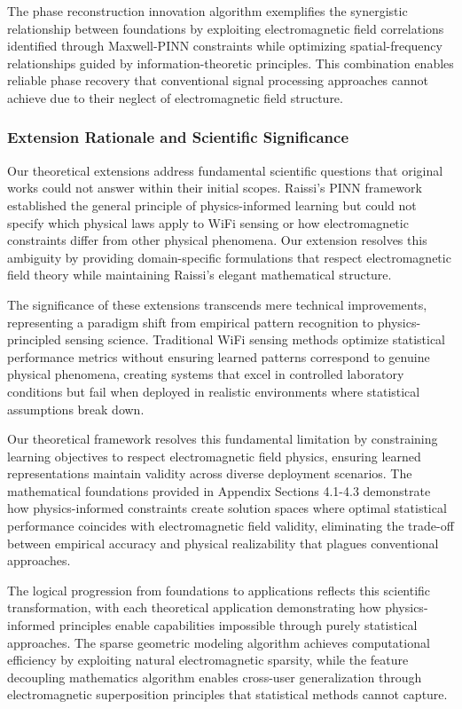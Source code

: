 \documentclass[journal]{IEEEtran}
\begin{document}
The phase reconstruction innovation algorithm exemplifies the synergistic relationship between foundations by exploiting electromagnetic field correlations identified through Maxwell-PINN constraints while optimizing spatial-frequency relationships guided by information-theoretic principles. This combination enables reliable phase recovery that conventional signal processing approaches cannot achieve due to their neglect of electromagnetic field structure.

\subsubsection{Extension Rationale and Scientific Significance}

Our theoretical extensions address fundamental scientific questions that original works could not answer within their initial scopes. Raissi's PINN framework established the general principle of physics-informed learning but could not specify which physical laws apply to WiFi sensing or how electromagnetic constraints differ from other physical phenomena. Our extension resolves this ambiguity by providing domain-specific formulations that respect electromagnetic field theory while maintaining Raissi's elegant mathematical structure.

The significance of these extensions transcends mere technical improvements, representing a paradigm shift from empirical pattern recognition to physics-principled sensing science. Traditional WiFi sensing methods optimize statistical performance metrics without ensuring learned patterns correspond to genuine physical phenomena, creating systems that excel in controlled laboratory conditions but fail when deployed in realistic environments where statistical assumptions break down.

Our theoretical framework resolves this fundamental limitation by constraining learning objectives to respect electromagnetic field physics, ensuring learned representations maintain validity across diverse deployment scenarios. The mathematical foundations provided in Appendix Sections 4.1-4.3 demonstrate how physics-informed constraints create solution spaces where optimal statistical performance coincides with electromagnetic field validity, eliminating the trade-off between empirical accuracy and physical realizability that plagues conventional approaches.

The logical progression from foundations to applications reflects this scientific transformation, with each theoretical application demonstrating how physics-informed principles enable capabilities impossible through purely statistical approaches. The sparse geometric modeling algorithm achieves computational efficiency by exploiting natural electromagnetic sparsity, while the feature decoupling mathematics algorithm enables cross-user generalization through electromagnetic superposition principles that statistical methods cannot capture.
\end{document}
